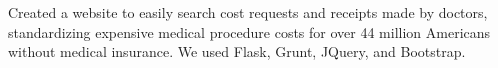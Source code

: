 \documentclass[]{deedy-resume-openfont}
\begin{document}
\begin{minipage}[t]{0.66\textwidth}
\begin{tightemize}
\item Created a website to easily search cost requests and receipts made by doctors, standardizing expensive medical procedure costs for over 44 million Americans without medical insurance. We used Flask, Grunt, JQuery, and Bootstrap.
\end{tightemize}

\end{minipage} 
\end{document}
